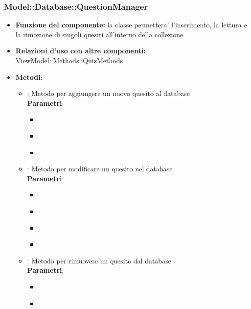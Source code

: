 \subsubsection{Model::Database::QuestionManager}
\begin{itemize}
\item\textbf{Funzione del componente:} la classe permettera' l'inserimento, la lettura e la rimozione di singoli quesiti all'interno della collezione
\item\textbf{Relazioni d'uso con altre componenti:} ViewModel::Methods::QuizMethods\\
\item\textbf{Metodi}:
	\begin{itemize}
		\item{} : Metodo per aggiungere un nuovo quesito al database\\
		\textbf{Parametri}:
			\begin{itemize}
				\item{}\\
				\item{}\\
				\item{}\\
			\end{itemize}
		\item{} : Metodo per modificare un quesito nel database\\
		\textbf{Parametri}:
			\begin{itemize}
				\item{}\\
				\item{}\\
				\item{}\\
				\item{}\\
			\end{itemize}
		\item{} : Metodo per rimuovere un quesito dal database\\
		\textbf{Parametri}:
			\begin{itemize}
				\item{}\\
				\item{}\\
			\end{itemize}
	\end{itemize}
\end{itemize}

